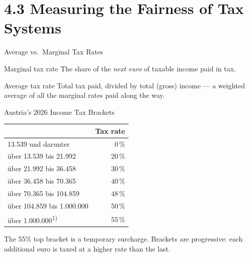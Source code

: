 \documentclass[11pt,aspectratio=169]{beamer}
\begin{document}
\section{4.3 Measuring the Fairness of Tax Systems}

\begin{frame}{Average vs.\ Marginal Tax Rates}
  \begin{block}{Marginal tax rate}
    The share of the \emph{next euro} of taxable income paid in tax.
  \end{block}
  \begin{block}{Average tax rate}
    Total tax paid, divided by total (gross) income --- a weighted average of all the marginal rates paid along the way.
  \end{block}
\end{frame}

\begin{frame}{Austria's 2026 Income Tax Brackets}
 \begin{table}
 	\centering
 	\begin{tabular}{@{}lr@{}}
 		\toprule
 		\textbf{ } & \textbf{Tax rate} \\
 		\midrule
 		13.539 und darunter & 0\,\% \\
 		über 13.539 bis 21.992 & 20\,\% \\
 		über 21.992 bis 36.458 & 30\,\% \\
 		über 36.458 bis 70.365 & 40\,\% \\
 		über 70.365 bis 104.859 & 48\,\% \\
 		über 104.859 bis 1.000.000 & 50\,\% \\
 		über 1.000.000\textsuperscript{1)} & 55\,\% \\
 		\bottomrule
 	\end{tabular}
 
 \end{table}
  
  
  \vspace{0.5em}
   \small
  The 55\% top bracket is a temporary surcharge. Brackets are progressive: each additional euro is taxed at a higher rate than the last.\\
 
\end{frame}

 
\end{document}
